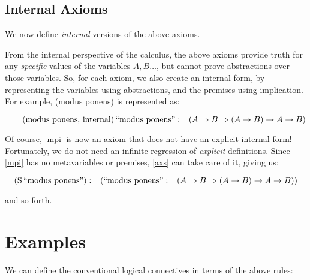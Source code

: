 \documentclass{article}
\begin{document}
  \subsection{Internal Axioms}

  We now define \emph{internal} versions of the above axioms.

  From the internal perspective of the calculus, the above axioms provide truth for any \emph{specific} values of the variables $A, B\dots$, but cannot prove abstractions over those variables.
  So, for each axiom, we also create an internal form, by representing the variables using abstractions, and the premises using implication.
  For example, (modus ponens) is represented as:

  \begin{equation*}
    \tag{modus ponens, internal}\label{mpi}
    \operatorname{\mathrm{``modus\ ponens"}} := 
      (A \Rightarrow B \Rightarrow (A \rightarrow B) \rightarrow A \rightarrow B)
   \\
  \end{equation*}

  Of course, \eqref{mpi} is now an axiom that does not have an explicit internal form!
  Fortunately, we do not need an infinite regression of \emph{explicit} definitions. Since \eqref{mpi} has no metavariables or premises, \eqref{axs} can take care of it, giving us:

  \begin{equation*}
    \axiom{(\wfsucc\operatorname{\mathrm{``modus\ ponens"}})}{(
      \axiom{\operatorname{\mathrm{``modus\ ponens"}}}{
        (\nameabstraction{A} \nameabstraction{B} (A \implies B) \implies A \implies B)
      }
    )}\\
  \end{equation*}

  and so forth.

  \section{Examples}\label{structure}

  We can define the conventional logical connectives in terms of the above rules:
\end{document}
